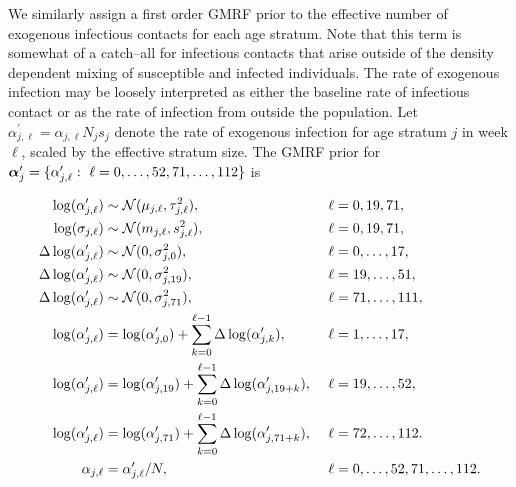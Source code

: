 We similarly assign a first order GMRF prior to the effective number of exogenous infectious contacts for each age stratum. Note that this term is somewhat of a catch--all for infectious contacts that arise outside of the density dependent mixing of susceptible and infected individuals. The rate of exogenous infection may be loosely interpreted as either the baseline rate of infectious contact or as the rate of infection from outside the population. Let $ \alpha^\prime_{j,\ell} = \alpha_{j,\ell}N_js_j $ denote the rate of exogenous infection for age stratum $ j $ in week $ \ell $, scaled by the effective stratum size. The GMRF prior for $ \balpha^\prime_j = \lbrace\alpha^\prime_{j,\ell}:\ \ell=0,\dots,52,71,\dots,112\rbrace $ is
\begin{small}
	\begin{align}
	\log(\alpha^\prime_{j,\ell}) &\sim \mcN(\mu_{j,\ell},\tau_{j,\ell}^2),&\ &\ell= 0,19,71, \nonumber\\
	\log(\sigma_{j,\ell}) &\sim \mcN(m_{j,\ell}, s_{j,\ell}^2),&\ &\ell=0,19,71, \nonumber\\
	\Delta\log(\alpha^\prime_{j,\ell})&\sim \mcN(0, \sigma^2_{j,0}),&\ &\ell=0,\dots,17, \nonumber\\
	\Delta\log(\alpha^\prime_{j,\ell})&\sim \mcN(0, \sigma^2_{j,19}),&\ &\ell=19,\dots,51, \nonumber\\
	\Delta\log(\alpha^\prime_{j,\ell})&\sim \mcN(0, \sigma^2_{j,71}),&\ &\ell=71,\dots,111, \nonumber\\
	\log(\alpha^\prime_{j,\ell}) &= \log(\alpha^\prime_{j,0}) + \sum_{k=0}^{\ell-1}\Delta\log(\alpha^\prime_{j,k}),&\ &\ell = 1,\dots,17, \nonumber\\
	\log(\alpha^\prime_{j,\ell}) &= \log(\alpha^\prime_{j,19}) + \sum_{k=0}^{\ell-1}\Delta\log(\alpha^\prime_{j,19+k}),&\ &\ell = 19,\dots,52, \nonumber\\
	\log(\alpha^\prime_{j,\ell}) &= \log(\alpha^\prime_{j,71}) + \sum_{k=0}^{\ell-1}\Delta\log(\alpha^\prime_{j,71+k}),&\ &\ell = 72,\dots,112. \nonumber \\
	\alpha_{j,\ell} &= \alpha^\prime_{j,\ell}/N,&\ &\ell=0,\dots,52,71,\dots,112. \nonumber
	\end{align}
\end{small}


